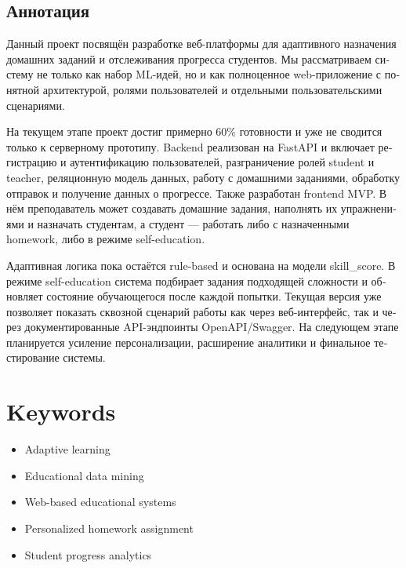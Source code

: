 \documentclass[a4paper,12pt]{extarticle}
\begin{document}
\begin{otherlanguage}{russian}
\section*{Аннотация}
Данный проект посвящён разработке веб-платформы для адаптивного назначения домашних заданий и отслеживания прогресса студентов. Мы рассматриваем систему не только как набор ML-идей, но и как полноценное web-приложение с понятной архитектурой, ролями пользователей и отдельными пользовательскими сценариями.

На текущем этапе проект достиг примерно 60\% готовности и уже не сводится только к серверному прототипу. Backend реализован на FastAPI и включает регистрацию и аутентификацию пользователей, разграничение ролей student и teacher, реляционную модель данных, работу с домашними заданиями, обработку отправок и получение данных о прогрессе. Также разработан frontend MVP. В нём преподаватель может создавать домашние задания, наполнять их упражнениями и назначать студентам, а студент --- работать либо с назначенными homework, либо в режиме self-education.

Адаптивная логика пока остаётся rule-based и основана на модели skill\_score. В режиме self-education система подбирает задания подходящей сложности и обновляет состояние обучающегося после каждой попытки. Текущая версия уже позволяет показать сквозной сценарий работы как через веб-интерфейс, так и через документированные API-эндпоинты OpenAPI/Swagger. На следующем этапе планируется усиление персонализации, расширение аналитики и финальное тестирование системы.
\end{otherlanguage}

\newpage

\section*{Keywords}

\begin{itemize}
    \item Adaptive learning
    \item Educational data mining
    \item Web-based educational systems
    \item Personalized homework assignment
    \item Student progress analytics
\end{itemize}
\end{document}

